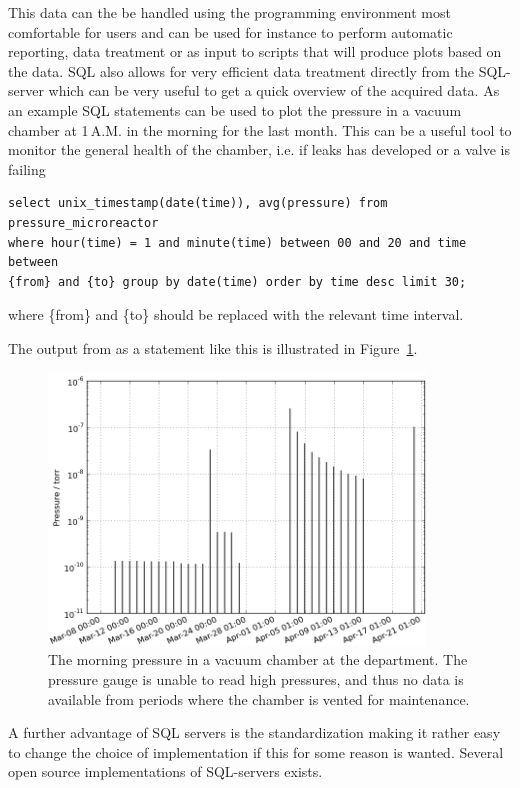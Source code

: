 This data can the be handled using the programming environment most comfortable
for users and can be used for instance to perform automatic reporting, data
treatment or as input to scripts that will produce plots based on the data. SQL
also allows for very efficient data treatment directly from the SQL-server
which can be very useful to get a quick overview of the acquired data. As an
example SQL statements can be used to plot the pressure in a vacuum chamber at
1\,A.M. in the morning for the last month. This can be a useful tool to monitor
the general health of the chamber, i.e. if leaks has developed or a valve is
failing
\begin{verbatim}
select unix_timestamp(date(time)), avg(pressure) from pressure_microreactor
where hour(time) = 1 and minute(time) between 00 and 20 and time between
{from} and {to} group by date(time) order by time desc limit 30;
\end{verbatim}
where \{from\}  and \{to\} should be replaced with the relevant time interval.

The output from as a statement like this is illustrated in
Figure~\ref{fig:morning_pressure}.
\begin{figure}
 \begin{center}
 \includegraphics[width=10cm]{morning_pressure.png}
 \caption{ The morning pressure in a vacuum chamber at the department. The
   pressure gauge is unable to read high pressures, and thus no data is
   available from periods where the chamber is vented for maintenance.
   \label{fig:morning_pressure}
 } 
 \end{center}
\end{figure}

A further advantage of SQL servers is the standardization making it rather easy
to change the choice of implementation if this for some reason is wanted.
Several open source implementations of SQL-servers exists.



